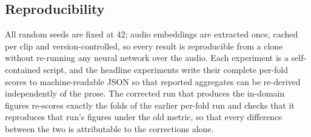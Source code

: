 \subsection{Reproducibility}

All random seeds are fixed at 42; audio embeddings are extracted once, cached per clip and
version-controlled, so every result is reproducible from a clone without re-running any
neural network over the audio. Each experiment is a self-contained script, and the
headline experiments write their complete per-fold scores to machine-readable JSON so that
reported aggregates can be re-derived independently of the prose. The corrected run that
produces the in-domain figures re-scores exactly the folds of the earlier per-fold run and
checks that it reproduces that run's figures under the old metric, so that every difference
between the two is attributable to the corrections alone.
